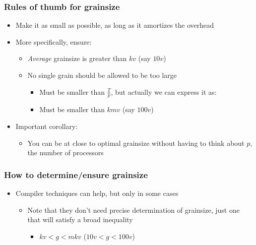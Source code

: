 \documentclass{beamer}
\begin{document}
\begin{frame}
  \frametitle{Rules of thumb for grainsize}
  \begin{itemize}
    \item Make it as small as possible, as long as it amortizes the overhead
    \item More specifically, ensure:
      \begin{itemize}
      \item \textit{Average} grainsize is greater than $kv$ (say $10v$)
      \item No single grain should be allowed to be too large 
        \begin{itemize}
          \item Must be smaller than $\frac{T}{p}$, but actually we can express
            it as:
          \item Must be smaller than $kmv$ (say $100v$)
        \end{itemize}
      \end{itemize}
    \item Important corollary:
      \begin{itemize}
      \item You can be at close to optimal grainsize without having to think
        about $p$, the number of processors
      \end{itemize}
  \end{itemize}
\end{frame}

\begin{frame}
  \frametitle{How to determine/ensure grainsize}
  \begin{itemize}
    \item Compiler techniques can help, but only in some cases
      \begin{itemize}
        \item Note that they don't need precise determination of grainsize,
          just one that will satisfy a broad inequality
          \begin{itemize}
            \item $kv < g < mkv$ ($10v < g < 100v$)
          \end{itemize}
      \end{itemize}
  \end{itemize}
\end{frame}
\end{document}
